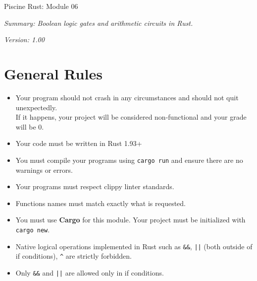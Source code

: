 \documentclass[a4paper,12pt]{report}
\begin{document}
\thispagestyle{empty}

\begin{center}
    \vspace*{2cm}

    \setbigpillar

    \vspace{2cm}

    {\Huge Piscine Rust: Module 06}
  
    \vfill

    \textit{Summary: Boolean logic gates and arithmetic circuits in Rust.}

    \vspace{0.5cm}

    \textit{Version: 1.00}

    \vspace{4cm}
\end{center}

\newpage

\thispagestyle{fancy}
\tableofcontents

\newpage

\chapter{General Rules}

\vspace{0.5cm}

\begin{itemize}[leftmargin=1.5em, itemsep=0.8em]
    \item Your program should not crash in any circumstances and should not quit unexpectedly.\\
    If it happens, your project will be considered non-functional and your grade will be 0.
    \item Your code must be written in Rust 1.93+
    \item You must compile your programs using \texttt{cargo run} and ensure there are no warnings or errors.
    \item Your programs must respect clippy linter standards.
    \item Functions names must match exactly what is requested.
    \item You must use \textbf{Cargo} for this module. Your project must be initialized with \texttt{cargo new}.
    \item Native logical operations implemented in Rust such as \texttt{\&\&}, \texttt{||} (both outside of if conditions), \texttt{\^{}} are strictly forbidden.
    \item Only \texttt{\&\&} and \texttt{||} are allowed only in if conditions. 
\end{itemize}
\end{document}
